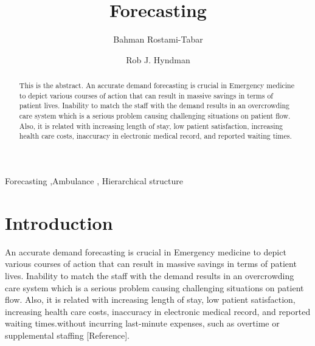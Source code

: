 \documentclass[
  authoryear,
  preprint,
  3p]{elsarticle}
\begin{document}
\begin{frontmatter}
\title{Forecasting}
\author[1]{Bahman Rostami-Tabar%
%
}
\author[2]{Rob J. Hyndman%
%
}



        
\begin{abstract}
This is the abstract. An accurate demand forecasting is crucial in
Emergency medicine to depict various courses of action that can result
in massive savings in terms of patient lives. Inability to match the
staff with the demand results in an overcrowding care system which is a
serious problem causing challenging situations on patient flow. Also, it
is related with increasing length of stay, low patient satisfaction,
increasing health care costs, inaccuracy in electronic medical record,
and reported waiting times.
\end{abstract}





\begin{keyword}
    Forecasting \sep Ambulance \sep 
    Hierarchical structure
\end{keyword}
\end{frontmatter}
    \ifdefined\Shaded\renewenvironment{Shaded}{\begin{tcolorbox}[frame hidden, interior hidden, breakable, enhanced, boxrule=0pt, borderline west={3pt}{0pt}{shadecolor}, sharp corners]}{\end{tcolorbox}}\fi

\hypertarget{introduction}{%
\section{Introduction}\label{introduction}}

An accurate demand forecasting is crucial in Emergency medicine to
depict various courses of action that can result in massive savings in
terms of patient lives. Inability to match the staff with the demand
results in an overcrowding care system which is a serious problem
causing challenging situations on patient flow. Also, it is related with
increasing length of stay, low patient satisfaction, increasing health
care costs, inaccuracy in electronic medical record, and reported
waiting times.without incurring last-minute expenses, such as overtime
or supplemental staffing {[}Reference{]}.
\end{document}
